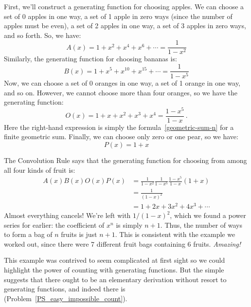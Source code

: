 First, we'll construct a generating function for choosing apples.  We
can choose a set of 0 apples in one way, a set of 1 apple in zero
ways (since the number of apples must be even), a set of 2 apples in
one way, a set of 3 apples in zero ways, and so forth.  So, we have:
%
\[
A(x) = 1 + x^2 + x^4 + x^6 + \cdots = \frac{1}{1 - x^2}
\]
%
Similarly, the generating function for choosing bananas is:
%
\[
B(x) = 1 + x^5 + x^{10} + x^{15} + \cdots = \frac{1}{1 - x^5}
\]
Now, we can choose a set of 0 oranges in one way, a set of 1 orange in
one way, and so on.  However, we cannot choose more than four
oranges, so we have the generating function:
%
\[
O(x) = 1 + x + x^2 + x^3 + x^4 = \frac{1-x^5}{1-x}\, .
\]
Here the right-hand expression is simply the
formula~\eqref{geometric-sum-n} for a finite geometric sum.  Finally,
we can choose only zero or one pear, so we have:
%
\[
P(x) = 1 + x
\]

The Convolution Rule says that the generating function for choosing
from among all four kinds of fruit is:
%
\begin{align*}
A(x) B(x) O(x) P(x)
    & = \frac{1}{1-x^2} \frac{1}{1-x^5} \frac{1-x^5}{1-x} (1 + x) \\
    & = \frac{1}{(1-x)^2} \\
    & = 1 + 2x + 3x^2 + 4 x^3 + \cdots
\end{align*}
%
Almost everything cancels!  We're left with $1 / (1-x)^2$, which we
found a power series for earlier: the coefficient of $x^n$ is simply
$n+1$.  Thus, the number of ways to form a bag of $n$ fruits is just
$n+1$.  This is consistent with the example we worked out, since there
were 7 different fruit bags containing 6 fruits.  \textit{Amazing!}

This example was contrived to seem complicated at first sight so we
could highlight the power of counting with generating functions.  But
the simple suggests that there ought to be an elementary derivation
without resort to generating functions, and indeed there is
(Problem~\ref{PS_easy_impossible_count}).

\begin{problems}
\practiceproblems
{}

\classproblems
{}

\homeworkproblems
{}

\end{problems}


